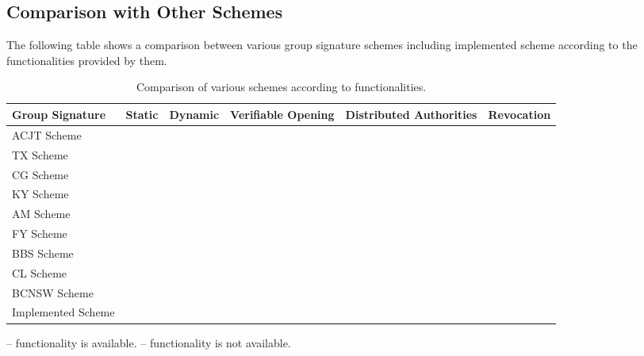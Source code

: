 \subsection{Comparison with Other Schemes}
The following table shows a comparison between various group signature schemes including implemented scheme according to the functionalities provided by them.

\begin{table}[!h]
\begin{threeparttable}
\renewcommand{\arraystretch}{1.3}
\caption{Comparison of various schemes according to functionalities.}
\label{table:functionalities}
\centering
\begin{tabular}{| >{\arraybackslash}m{1.3in} |>{\centering\arraybackslash}m{0.5in} |>{\centering\arraybackslash}m{0.7in} |>{\centering\arraybackslash}m{0.8in} |>{\centering\arraybackslash}m{1in} |>{\centering\arraybackslash}m{0.9in} |}

\hline 
\textbf{Group Signature} & \textbf{Static} & \textbf{Dynamic} & \textbf{Verifiable Opening} & \textbf{Distributed Authorities} & \textbf{Revocation} \\ 
\hline\hline

ACJT Scheme			& \xmark & \cmark & \cmark & \xmark & \xmark \\ \hline
TX Scheme		 	& \xmark & \cmark & \xmark & \xmark & \cmark \\ \hline
CG Scheme  		 	& \cmark & \xmark & \xmark & \xmark & \xmark \\ \hline
KY Scheme  		 	& \xmark & \cmark & \cmark & \cmark & \xmark \\ \hline\hline
AM Scheme  		 	& \xmark & \cmark & \cmark & \xmark & \xmark \\ \hline
FY Scheme  		 	& \xmark & \cmark & \cmark & \cmark & \xmark \\ \hline\hline
BBS Scheme		 	& \cmark & \xmark & \xmark & \xmark & \xmark \\ \hline
CL Scheme		 	& \xmark & \cmark & \xmark & \cmark & \xmark \\ \hline
BCNSW Scheme	 	& \xmark & \cmark & \cmark & \xmark & \xmark \\ \hline\hline
Implemented Scheme	& \xmark & \cmark & \cmark & \cmark & \cmark \\ \hline

\end{tabular}
\begin{tablenotes}
\item \cmark -- functionality is available. \hspace{0.5in} \xmark -- functionality is not available.
\end{tablenotes}
\end{threeparttable}
\end{table}

